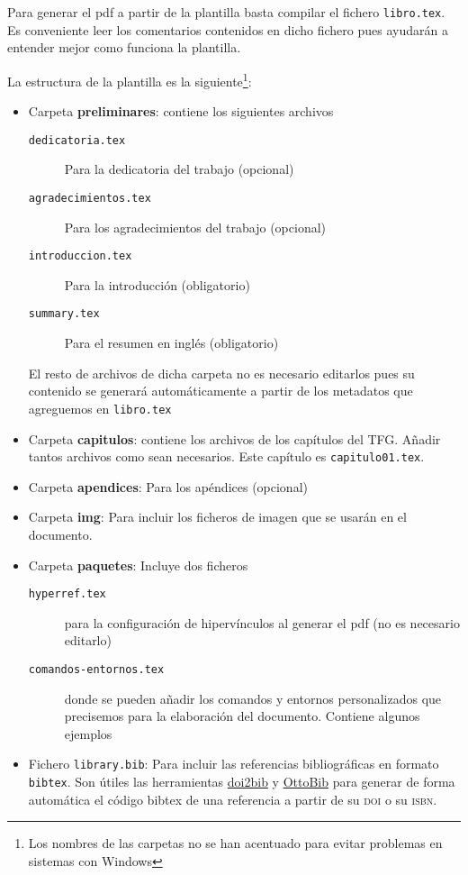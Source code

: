 Para generar el pdf a partir de la plantilla basta compilar el fichero \texttt{libro.tex}. Es conveniente leer los comentarios contenidos en dicho fichero pues ayudarán a entender mejor como funciona la plantilla. 

La estructura de la plantilla es la siguiente\footnote{Los nombres de las carpetas no se han acentuado para evitar problemas en sistemas con Windows}: 
\begin{itemize}
  \item Carpeta \textbf{preliminares}: contiene los siguientes archivos
    \begin{description}
      \item[\texttt{dedicatoria.tex}] Para la dedicatoria del trabajo (opcional)
      \item[\texttt{agradecimientos.tex}] Para los agradecimientos del trabajo (opcional)
      \item[\texttt{introduccion.tex}] Para la introducción (obligatorio)
      \item[\texttt{summary.tex}] Para el resumen en inglés (obligatorio)
  \end{description}
  El resto de archivos de dicha carpeta no es necesario editarlos pues su contenido se generará automáticamente a partir de los metadatos que agreguemos en \texttt{libro.tex}

  \item Carpeta \textbf{capitulos}: contiene los archivos de los capítulos del TFG. Añadir tantos archivos como sean necesarios. Este capítulo es \texttt{capitulo01.tex}.

  \item Carpeta \textbf{apendices}: Para los apéndices (opcional)
  \item Carpeta \textbf{img}: Para incluir los ficheros de imagen que se usarán en el documento.
  \item Carpeta \textbf{paquetes}: Incluye dos ficheros 
    \begin{description}
      \item[\texttt{hyperref.tex}] para la configuración de hipervínculos al generar el pdf (no es necesario editarlo) 
      \item[\texttt{comandos-entornos.tex}] donde se pueden añadir los comandos y entornos personalizados que precisemos para la elaboración del documento. Contiene algunos ejemplos
    \end{description}
    
  \item Fichero \texttt{library.bib}: Para incluir las referencias bibliográficas en formato \texttt{bibtex}. Son útiles las herramientas \href{https://www.doi2bib.org/}{doi2bib} y \href{https://www.ottobib.com/}{OttoBib} para generar de forma automática el código bibtex de una referencia a partir de su \textsc{doi} o su \textsc{isbn}.


\end{itemize}
